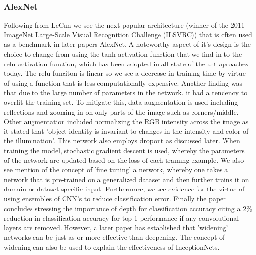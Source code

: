   \subsubsection{AlexNet}
    Following from LeCun we see the next popular architecture (winner of the 2011 ImageNet Large-Scale Visual Recognition Challenge (ILSVRC)) that is often used as a benchmark in later papers AlexNet\citep{Krizhevsky}. A noteworthy aspect of it's design is the choice to change from using the tanh activation function that we find in \citep{leCun1998} to the relu activation function, which has been adopted in all state of the art aproaches today. The relu funciton is linear so we see a decrease in training time by virtue of using a function that is less computationally expensive. Another finding was that due to the large number of parameters in the network, it had a tendency to overfit the training set. To mitigate this, data augmentation is used including reflections and zooming in on only parts of the image such as corners/middle. Other augmentation included normalizing the RGB intensity across the image as it stated that 'object identity is invariant to changes in the intensity and color of the illumination'. This network also employs dropout as discussed later. When training the model, stochastic gradient descent is used, whereby the parameters of the network are updated based on the loss of each training example. We also see mention of the concept of 'fine tuning' a network, whereby one takes a network that is pre-trained on a generalized dataset and then further trains it on domain or dataset specific input. Furthermore, we see evidence for the virtue of using ensembles of CNN's to reduce classification error. Finally the paper concludes stressing the importance of depth for classification accuracy citing a 2\% reduction in classification accuracy for top-1 performance if any convolutional layers are removed. However, a later paper \citep{Zagoruyko} has established that 'widening' networks can be just as or more effective than deepening. The concept of widening can also be used to explain the effectiveness of InceptionNets.

